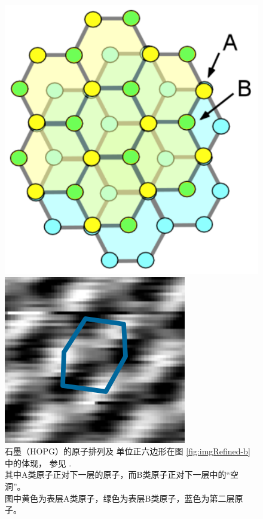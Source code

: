 \documentclass[aps,pre,12pt,preprint,%
	onecolumn,showpacs,showkeys,nofootinbib]{revtex4-1}
\begin{document}
	\begin{figure}[!h]
	\centering
	\vspace{-.5\baselineskip}
	\parbox{.45\linewidth}{
		\includegraphics[width=\linewidth]{HOPGstruct.png}}\quad
	\parbox{.45\linewidth}{
		\includegraphics[width=\linewidth]{img/1800 - 对比增强 - MOD.png}}
	\caption[HOPG]{石墨（\textup{HOPG}）的原子排列及
		单位正六边形在图 \textup{\ref{fig:imgRefined-b}} 中的体现，
		参见 \cite{LABUNIT530:online}. \\
		其中\textup{A}类原子正对下一层的原子，而\textup{B}类原子正对下一层中的“空洞”。\\
		图中黄色为表层\textup{A}类原子，绿色为表层\textup{B}类原子，蓝色为第二层原子。
		\vspace{.5ex}
	}
	\label{fig:HOPGstruct}
	\end{figure}
	
\end{document}

